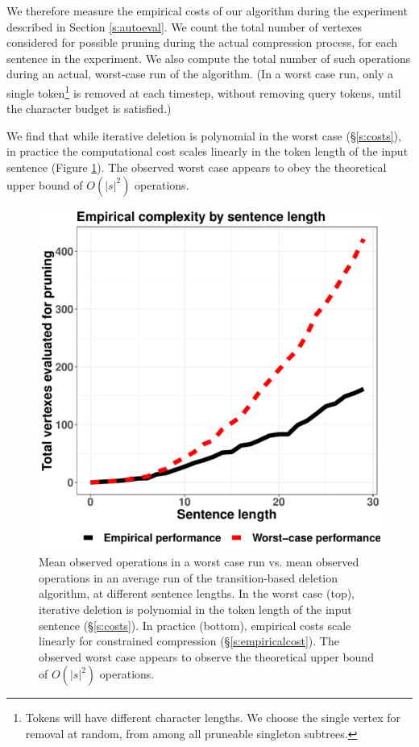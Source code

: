 \documentclass[11pt,a4paper]{article}
\newcommand{\ahcomment}[1]{\textcolor{blue}{[#1 -AH]}}
\begin{document}
We therefore measure the empirical costs of our algorithm during the experiment described in Section \ref{s:autoeval}. We count the total number of vertexes considered for possible pruning during the actual compression process, for each sentence in the experiment. We also compute the total number of such operations during an actual, worst-case run of the algorithm. (In a worst case run, only a single token\footnote{Tokens will have different character lengths. We choose the single vertex for removal at random, from among all pruneable singleton subtrees.} is removed at each timestep, without removing query tokens, until the character budget is satisfied.) 

We find that while iterative deletion is polynomial in the worst case (\S\ref{s:costs}), in practice the computational cost scales linearly in the token length of the input sentence (Figure \ref{f:example}). The observed worst case appears to obey the theoretical upper bound of $O(|s|^2)$ operations.

\begin{figure}[htb!]
\centering
\includegraphics[width=.4\textwidth]{observed.pdf}
\caption{Mean observed operations in a worst case run vs. mean observed operations in an average run of the transition-based deletion algorithm, at different sentence lengths. In the worst case (top), iterative deletion is polynomial in the token length of the input sentence (\S\ref{s:costs}). In practice (bottom), empirical costs scale linearly for constrained compression (\S\ref{s:empiricalcost}). The observed worst case appears to observe the theoretical upper bound of $O(|s|^2)$ operations.}
\label{f:example}
\end{figure}


\end{document}
